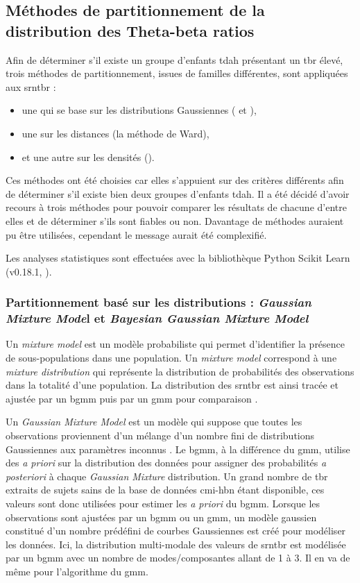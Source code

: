 \subsection{Méthodes de partitionnement de la distribution des Theta-beta ratios} \label{clustering}

Afin de déterminer s'il existe un groupe d'enfants \gls{tdah} présentant un \gls{tbr} élevé, trois méthodes de partitionnement, issues de familles différentes,
sont appliquées aux \gls{srntbr} : 
\begin{itemize}
\item une qui se base sur les distributions Gaussiennes ( et ), 
\item une sur les distances (la méthode de Ward),
\item et une autre sur les densités (). 
\end{itemize}

Ces méthodes ont été choisies car elles s'appuient sur des critères différents afin de déterminer s'il existe bien deux groupes d'enfants \gls{tdah}. Il a été décidé
d'avoir recours à trois méthodes pour pouvoir comparer les résultats de chacune d'entre elles et de déterminer s'ils sont fiables ou non. Davantage de méthodes auraient pu
être utilisées, cependant le message aurait été complexifié.   

Les analyses statistiques sont effectuées avec la bibliothèque Python Scikit Learn (v0.18.1, \citet{Pedregosa2011}).

\subsubsection{Partitionnement basé sur les distributions : \textit{Gaussian Mixture Mode}l et \textit{Bayesian Gaussian Mixture Model}} 
Un \textit{mixture model} est un modèle probabiliste qui permet d'identifier la présence de sous-populations dans une population. Un \textit{mixture model}
correspond à une \textit{mixture distribution} qui représente la distribution de probabilités des observations dans la totalité d'une population.
La distribution des \gls{srntbr} est ainsi tracée et ajustée par un \gls{bgmm} puis par un \gls{gmm} pour comparaison \citep{Attias2000, Blei2006}. 

Un \textit{Gaussian Mixture Model} est un modèle qui suppose que toutes les observations proviennent d'un mélange 
d'un nombre fini de distributions Gaussiennes aux paramètres inconnus \citep{Yu2016}. 
Le \gls{bgmm}, à la différence du \gls{gmm}, utilise des \textit{a priori} sur la distribution des données pour 
assigner des probabilités \textit{a posteriori} à chaque \textit{Gaussian Mixture} distribution. Un grand nombre de \gls{tbr} 
extraits de sujets sains de la base de données \gls{cmi-hbn} étant disponible, ces valeurs sont donc utilisées pour estimer les \textit{a priori} du \gls{bgmm}. 
Lorsque les observations sont ajustées par un \gls{bgmm} ou un \gls{gmm}, un modèle gaussien constitué d'un nombre prédéfini de courbes Gaussiennes est 
créé pour modéliser les données. Ici, la distribution multi-modale des valeurs de \gls{srntbr} est modélisée par un \gls{bgmm} avec un nombre 
de modes/composantes allant de 1 à 3. 
Il en va de même pour l'algorithme du \gls{gmm}. 

